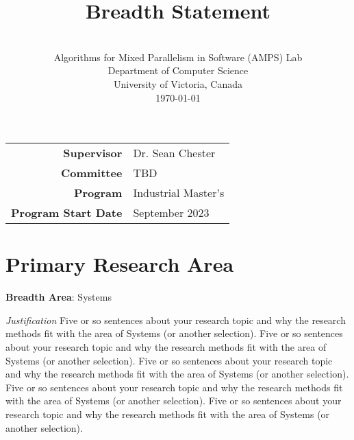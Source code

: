 \documentclass{article}
\title{Breadth Statement}
\author{\name}
\date{%
    \faEnvelope\ \ \href{mailto:\email}{\email}\\%
    Algorithms for Mixed Parallelism in Software ({\faBolt}AMPS) Lab\\%
    Department of Computer Science\\%
    University of Victoria, Canada\\[2em]%
    \today
}
\begin{document}
\maketitle

\begin{table}[h!]
  \vspace{-2em}
  \centering
    \begin{tabular}{rl}
      {\bfseries Supervisor} & Dr. Sean Chester\\
      {\bfseries Committee} & TBD\\
      {\bfseries Program} & Industrial Master's\\
      {\bfseries Program Start Date} & September 2023
  \end{tabular}
\end{table}

\section{Primary Research Area}

\noindent
{\bfseries Breadth Area}: Systems

\medskip\noindent
{\em Justification}\hspace{0.5em}
Five or so sentences about your research topic and why the research methods fit with the area of Systems (or another selection).
Five or so sentences about your research topic and why the research methods fit with the area of Systems (or another selection).
Five or so sentences about your research topic and why the research methods fit with the area of Systems (or another selection).
Five or so sentences about your research topic and why the research methods fit with the area of Systems (or another selection).
Five or so sentences about your research topic and why the research methods fit with the area of Systems (or another selection).
\end{document}

